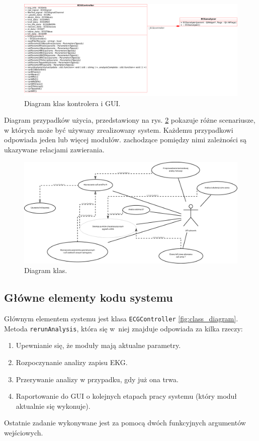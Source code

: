 \documentclass[a4paper, 11pt]{article}
\begin{document}
\begin{figure}[h!]
  \centering
  \includegraphics[width=0.9\linewidth]{include/controller-gui}
  \caption{Diagram klas kontrolera i GUI.}
  \label{fig:controller-gui}
\end{figure}

Diagram przypadków użycia, przedstawiony na rys. \ref{fig:use_case_diagram} pokazuje różne scenariusze, w których może być używany zrealizowany system. Każdemu przypadkowi odpowiada jeden lub więcej modułów. zachodzące pomiędzy nimi zależności są ukazywane relacjami zawierania.
\begin{figure}[h!]
  \centering
  \includegraphics[width=\linewidth]{include/use_case_diagram}
  \caption{Diagram klas.}
  \label{fig:use_case_diagram}
\end{figure}

\subsection{Główne elementy kodu systemu}

Głównym elementem systemu jest klasa \verb+ECGController+ \ref{fig:class_diagram}. Metoda \verb+rerunAnalysis+, która się w~niej znajduje odpowiada za kilka rzeczy:
\begin{enumerate}
\item Upewnianie się, że moduły mają aktualne parametry.
\item Rozpoczynanie analizy zapisu EKG.
\item Przerywanie analizy w przypadku, gdy już ona trwa.
\item Raportowanie do GUI o kolejnych etapach pracy systemu (który moduł aktualnie się wykonuje).
\end{enumerate}
Ostatnie zadanie wykonywane jest za pomocą dwóch funkcyjnych argumentów wejściowych.
\end{document}
